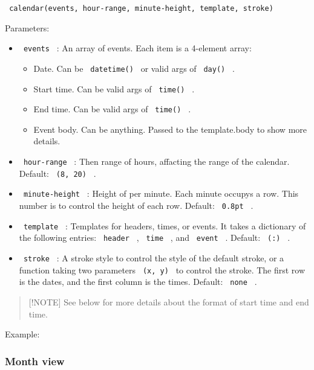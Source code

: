 \texttt{\ calendar(events,\ hour-range,\ minute-height,\ template,\ stroke)\ }

Parameters:

\begin{itemize}
\tightlist
\item
  \texttt{\ events\ } : An array of events. Each item is a 4-element
  array:

  \begin{itemize}
  \tightlist
  \item
    Date. Can be \texttt{\ datetime()\ } or valid args of
    \texttt{\ day()\ } .
  \item
    Start time. Can be valid args of \texttt{\ time()\ } .
  \item
    End time. Can be valid args of \texttt{\ time()\ } .
  \item
    Event body. Can be anything. Passed to the template.body to show
    more details.
  \end{itemize}
\item
  \texttt{\ hour-range\ } : Then range of hours, affacting the range of
  the calendar. Default: \texttt{\ (8,\ 20)\ } .
\item
  \texttt{\ minute-height\ } : Height of per minute. Each minute occupys
  a row. This number is to control the height of each row. Default:
  \texttt{\ 0.8pt\ } .
\item
  \texttt{\ template\ } : Templates for headers, times, or events. It
  takes a dictionary of the following entries: \texttt{\ header\ } ,
  \texttt{\ time\ } , and \texttt{\ event\ } . Default: \texttt{\ (:)\ }
  .
\item
  \texttt{\ stroke\ } : A stroke style to control the style of the
  default stroke, or a function taking two parameters
  \texttt{\ (x,\ y)\ } to control the stroke. The first row is the
  dates, and the first column is the times. Default: \texttt{\ none\ } .
\end{itemize}

\begin{quote}
{[}!NOTE{]} See below for more details about the format of start time
and end time.
\end{quote}

Example:


\subsubsection{Month view}\label{month-view}

